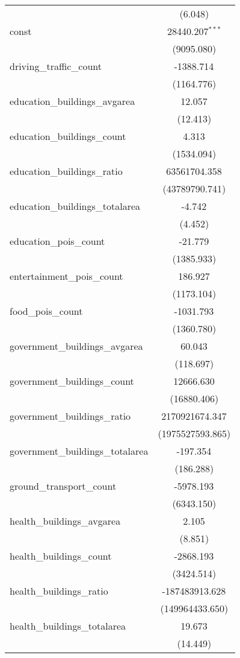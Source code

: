 \begin{table}[!htbp]
\begin{tabular}{@{\extracolsep{5pt}}lc}
  & (6.048) \\
 const & 28440.207$^{***}$ \\
  & (9095.080) \\
 driving_traffic_count & -1388.714$^{}$ \\
  & (1164.776) \\
 education_buildings_avgarea & 12.057$^{}$ \\
  & (12.413) \\
 education_buildings_count & 4.313$^{}$ \\
  & (1534.094) \\
 education_buildings_ratio & 63561704.358$^{}$ \\
  & (43789790.741) \\
 education_buildings_totalarea & -4.742$^{}$ \\
  & (4.452) \\
 education_pois_count & -21.779$^{}$ \\
  & (1385.933) \\
 entertainment_pois_count & 186.927$^{}$ \\
  & (1173.104) \\
 food_pois_count & -1031.793$^{}$ \\
  & (1360.780) \\
 government_buildings_avgarea & 60.043$^{}$ \\
  & (118.697) \\
 government_buildings_count & 12666.630$^{}$ \\
  & (16880.406) \\
 government_buildings_ratio & 2170921674.347$^{}$ \\
  & (1975527593.865) \\
 government_buildings_totalarea & -197.354$^{}$ \\
  & (186.288) \\
 ground_transport_count & -5978.193$^{}$ \\
  & (6343.150) \\
 health_buildings_avgarea & 2.105$^{}$ \\
  & (8.851) \\
 health_buildings_count & -2868.193$^{}$ \\
  & (3424.514) \\
 health_buildings_ratio & -187483913.628$^{}$ \\
  & (149964433.650) \\
 health_buildings_totalarea & 19.673$^{}$ \\
  & (14.449) \\

\end{tabular}
\end{table}
